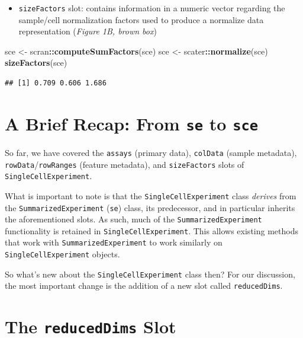\documentclass[]{book}
\newenvironment{Shaded}{\begin{snugshade}}{\end{snugshade}}
\newcommand{\KeywordTok}[1]{\textcolor[rgb]{0.13,0.29,0.53}{\textbf{#1}}}
\newcommand{\NormalTok}[1]{#1}
\newcommand{\OperatorTok}[1]{\textcolor[rgb]{0.81,0.36,0.00}{\textbf{#1}}}
\newcommand{\StringTok}[1]{\textcolor[rgb]{0.31,0.60,0.02}{#1}}
\providecommand{\tightlist}{%
  \setlength{\itemsep}{0pt}\setlength{\parskip}{0pt}}
\begin{document}
\begin{itemize}
\tightlist
\item
  \texttt{sizeFactors} slot: contains information in a numeric vector regarding the sample/cell normalization factors used to produce a normalize data representation (\emph{Figure 1B, brown box})
\end{itemize}

\begin{Shaded}
\begin{Highlighting}[]
\NormalTok{sce <-}\StringTok{ }\NormalTok{scran}\OperatorTok{::}\KeywordTok{computeSumFactors}\NormalTok{(sce)}
\NormalTok{sce <-}\StringTok{ }\NormalTok{scater}\OperatorTok{::}\KeywordTok{normalize}\NormalTok{(sce)}
\KeywordTok{sizeFactors}\NormalTok{(sce)}
\end{Highlighting}
\end{Shaded}

\begin{verbatim}
## [1] 0.709 0.606 1.686
\end{verbatim}

\hypertarget{a-brief-recap-from-se-to-sce}{%
\section{\texorpdfstring{A Brief Recap: From \texttt{se} to \texttt{sce}}{A Brief Recap: From se to sce}}\label{a-brief-recap-from-se-to-sce}}

So far, we have covered the \texttt{assays} (primary data), \texttt{colData} (sample metadata), \texttt{rowData}/\texttt{rowRanges} (feature metadata), and \texttt{sizeFactors} slots of \texttt{SingleCellExperiment}.

What is important to note is that the \texttt{SingleCellExperiment} class \emph{derives} from the \texttt{SummarizedExperiment} (\texttt{se}) class, its predecessor, and in particular inherits the aforementioned slots. As such, much of the \texttt{SummarizedExperiment} functionality is retained in \texttt{SingleCellExperiment}. This allows existing methods that work with \texttt{SummarizedExperiment} to work similarly on \texttt{SingleCellExperiment} objects.

So what's new about the \texttt{SingleCellExperiment} class then? For our discussion, the most important change is the addition of a new slot called \texttt{reducedDims}.

\hypertarget{the-reduceddims-slot}{%
\section{\texorpdfstring{The \texttt{reducedDims} Slot}{The reducedDims Slot}}\label{the-reduceddims-slot}}
\end{document}
